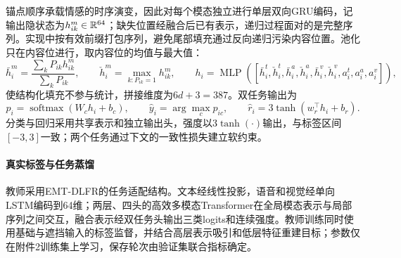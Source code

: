 锚点顺序承载情感的时序演变，因此对每个模态独立进行单层双向GRU编码，记输出隐状态为$h^m_{ik}\in\mathbb R^{64}$；缺失位置经融合后已有表示，递归过程面对的是完整序列。实现中按有效前缀打包序列，避免尾部填充通过反向递归污染内容位置。池化只在内容位进行，取内容位的均值与最大值：
\begin{equation}
\bar h^m_i=\frac{\sum_k P_{ik}h^m_{ik}}{\sum_k P_{ik}},\qquad
\check h^m_i=\max_{k:P_{ik}=1}h^m_{ik},\qquad
h_i=\operatorname{MLP}\left(\left[\bar h^t_i,\check h^t_i,\bar h^a_i,\check h^a_i,\bar h^v_i,\check h^v_i,a^t_i,a^a_i,a^v_i\right]\right),
\end{equation}
使结构化填充不参与统计，拼接维度为$6d+3=387$。双任务输出为
\begin{equation}
p_i=\operatorname{softmax}(W_ch_i+b_c),\qquad
\hat y_i=\arg\max_c p_{ic},\qquad
\hat r_i=3\tanh(w_r^\top h_i+b_r).
\end{equation}
分类与回归采用共享表示和独立输出头，强度以$3\tanh(\cdot)$输出，与标签区间$[-3,3]$一致；两个任务通过下文的一致性损失建立软约束。

\paragraph{真实标签与任务蒸馏}
教师采用EMT-DLFR的任务适配结构\cite{ref:emt}。文本经线性投影，语音和视觉经单向LSTM编码到64维；两层、四头的高效多模态Transformer在全局模态表示与局部序列之间交互，融合表示经双任务头输出三类logits和连续强度。教师训练同时使用基础与遮挡输入的标签监督，并结合高层表示吸引和低层特征重建目标；参数仅在附件2训练集上学习，保存轮次由验证集联合指标确定。

